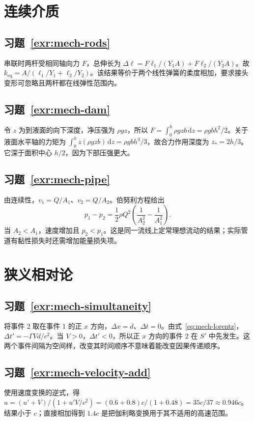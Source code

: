 \documentclass[UTF8,12pt,a4paper,fontset=fandol]{ctexbook}
\begin{document}
\section{连续介质}
\subsection*{习题~\ref{exr:mech-rods}}
串联时两杆受相同轴向力 $F$，总伸长为 $\Delta\ell=F\ell_1/(Y_1A)+F\ell_2/(Y_2A)$。故 $k_{\mathrm{eq}}=A/(\ell_1/Y_1+\ell_2/Y_2)$。该结果等价于两个线性弹簧的柔度相加，要求接头变形可忽略且两杆都在线弹性范围内。

\subsection*{习题~\ref{exr:mech-dam}}
令 $z$ 为到液面的向下深度，净压强为 $\rho gz$，所以 $F=\int_0^h\rho gzb\,\mathrm dz=\rho gbh^2/2$。关于液面水平轴的力矩为 $\int_0^hz(\rho gzb)\,\mathrm dz=\rho gbh^3/3$，故合力作用深度为 $z_*=2h/3$。它深于面积中心 $h/2$，因为下部压强更大。

\subsection*{习题~\ref{exr:mech-pipe}}
由连续性，$v_1=Q/A_1$、$v_2=Q/A_2$。伯努利方程给出
\[
 p_1-p_2=\frac12\rho Q^2\left(\frac1{A_2^2}-\frac1{A_1^2}\right).
\]
当 $A_2<A_1$，速度增加且 $p_2<p_1$。这是同一流线上定常理想流动的结果；实际管道有黏性损失时还需增加能量损失项。

\section{狭义相对论}
\subsection*{习题~\ref{exr:mech-simultaneity}}
将事件 $2$ 取在事件 $1$ 的正 $x$ 方向，$\Delta x=d$、$\Delta t=0$。由式~\eqref{eq:mech-lorentz}，$\Delta t'=-\Gamma Vd/c^2$。当 $V>0$，$\Delta t'<0$，所以正 $x$ 方向的事件 $2$ 在 $S'$ 中先发生。这两个事件间隔为空间样，改变其时间顺序不意味着能改变因果传递顺序。

\subsection*{习题~\ref{exr:mech-velocity-add}}
使用速度变换的逆式，得 $u=(u'+V)/(1+u'V/c^2)=(0.6+0.8)c/(1+0.48)=35c/37\approx0.946c$。结果小于 $c$；直接相加得到 $1.4c$ 是把伽利略变换用于其不适用的高速范围。
\end{document}
